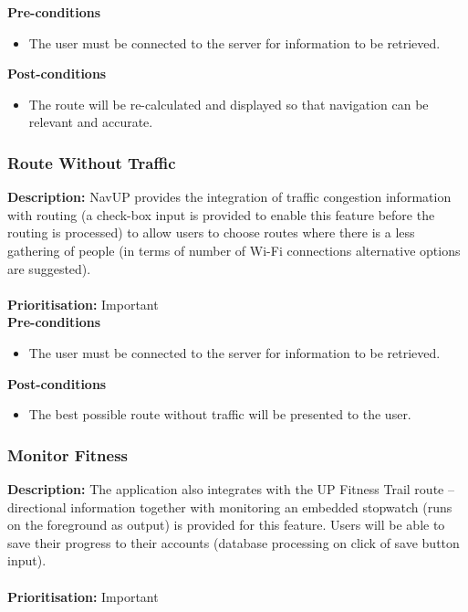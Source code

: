 \documentclass[runningheads,a4paper]{article}
\begin{document}
  
\textbf{Pre-conditions}
\begin{itemize}
	\item The user must be connected to the server for information to be retrieved.
\end{itemize}
  
\textbf{Post-conditions}
\begin{itemize}
  	\item The route will be re-calculated and displayed so that navigation can be relevant and accurate.
\end{itemize}

\subsubsection{Route Without Traffic}

\textbf{Description:}  NavUP provides the integration of traffic congestion information with routing (a check-box input is provided to enable this feature before the routing is processed) to allow users to choose routes where there is a less gathering of people (in terms of number of Wi-Fi connections alternative options are suggested).\\\\
\noindent
\textbf{Prioritisation:} Important\\
  
  
\textbf{Pre-conditions}
\begin{itemize}
	\item The user must be connected to the server for information to be retrieved.
\end{itemize}
  
\textbf{Post-conditions}
\begin{itemize}
  	\item The best possible route without traffic will be presented to the user.
\end{itemize}

\subsubsection{Monitor Fitness}

\textbf{Description:} The application also integrates with the UP Fitness Trail route – directional information together with monitoring an embedded stopwatch (runs on the foreground as output) is provided for this feature. Users will be able to save their progress to their accounts (database processing on click of save button input).\\\\
\noindent
\textbf{Prioritisation:} Important\\
  
\end{document}
